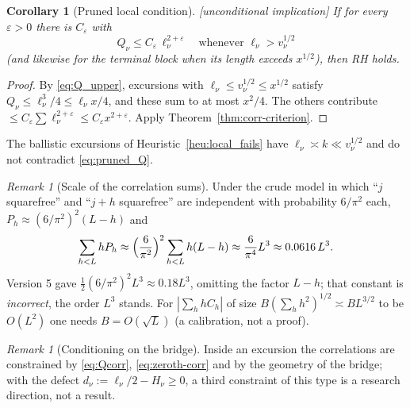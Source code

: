\documentclass[11pt]{amsart}
\numberwithin{equation}{section}
\theoremstyle{plain}
\newtheorem{corollary}[theorem]{Corollary}
\theoremstyle{definition}
\theoremstyle{remark}
\newtheorem{remark}[theorem]{Remark}
\newcommand{\eps}{\varepsilon}
\begin{document}
\begin{corollary}[Pruned local condition]
\label{cor:pruned_local}
\emph{[unconditional implication]} If for every $\eps>0$ there is $C_\eps$
with
\begin{equation}
\label{eq:pruned_Q}
  Q_\nu\le C_\eps\,\ell_\nu^{2+\eps}\quad\text{whenever }\ell_\nu>v_\nu^{1/2}
\end{equation}
(and likewise for the terminal block when its length exceeds $x^{1/2}$),
then RH holds.
\end{corollary}

\begin{proof}
By \eqref{eq:Q_upper}, excursions with $\ell_\nu\le v_\nu^{1/2}\le x^{1/2}$
satisfy $Q_\nu\le\ell_\nu^3/4\le\ell_\nu x/4$, and these sum to at most
$x^2/4$. The others contribute $\le C_\eps\sum\ell_\nu^{2+\eps}\le
C_\eps x^{2+\eps}$. Apply Theorem~\ref{thm:corr-criterion}.
\end{proof}

\noindent The ballistic excursions of Heuristic~\ref{heu:local_fails} have
$\ell_\nu\asymp k\ll v_\nu^{1/2}$ and do not contradict \eqref{eq:pruned_Q}.

\begin{remark}[Scale of the correlation sums]
\label{rem:chowla-scale}
Under the crude model in which ``$j$ squarefree'' and ``$j+h$ squarefree''
are independent with probability $6/\pi^2$ each,
$P_h\approx(6/\pi^2)^2(L-h)$ and
\begin{equation}
\label{eq:chowla_crude}
  \sum_{h<L}hP_h\approx\Bigl(\frac{6}{\pi^2}\Bigr)^2\sum_{h<L}h(L-h)
  \approx\frac{6}{\pi^4}L^3\approx0.0616\,L^3 .
\end{equation}
Version 5 gave $\tfrac12(6/\pi^2)^2L^3\approx0.18L^3$, omitting the factor
$L-h$; that constant is \emph{incorrect}, the order $L^3$ stands. For
$|\sum_hhC_h|$ of size $B(\sum_hh^2)^{1/2}\asymp BL^{3/2}$ to be $O(L^2)$ one
needs $B=O(\sqrt L)$ (a calibration, not a proof).
\end{remark}

\begin{remark}[Conditioning on the bridge]
\label{rem:conditioning}
Inside an excursion the correlations are constrained by
\eqref{eq:Qcorr}, \eqref{eq:zeroth-corr} and by the geometry of the bridge;
with the defect $d_\nu:=\ell_\nu/2-H_\nu\ge0$, a third constraint of this
type is a research direction, not a result.
\end{remark}
\end{document}
